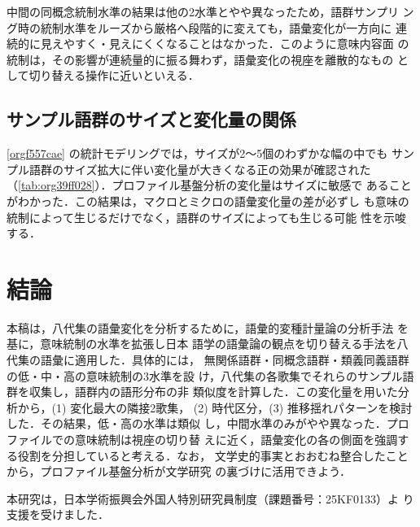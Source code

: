 \documentclass[submit]{ipsj}
\renewcommand{\ref}{\cref}
\begin{document}
中間の同概念統制水準の結果は他の2水準とやや異なったため，語群サンプリ
ング時の統制水準をルーズから厳格へ段階的に変えても，語彙変化が一方向に
連続的に見えやすく・見えにくくなることはなかった．このように意味内容面
の統制は，その影響が連続量的に振る舞わず，語彙変化の視座を離散的なもの
として切り替える操作に近いといえる．
\subsection{サンプル語群のサイズと変化量の関係\label{orgd277117}}
\label{sec:org412accf}
\ref{orgf557cae} の統計モデリングでは，サイズが2〜5個のわずかな幅の中でも
サンプル語群のサイズ拡大に伴い変化量が大きくなる正の効果が確認された
（\ref{tab:org39ff028}）．プロファイル基盤分析の変化量はサイズに敏感で
あることがわかった．この結果は，マクロとミクロの語彙変化量の差が必ずし
も意味の統制によって生じるだけでなく，語群のサイズによっても生じる可能
性を示唆する．
\section{結論\label{org396f025}}
\label{sec:org5bbac91}
本稿は，八代集の語彙変化を分析するために，語彙的変種計量論の分析手法
\cite{Speelman2003Profilebased} を基に，意味統制の水準を拡張し日本
語学の語彙論の観点を切り替える手法を八代集の語彙に適用した．具体的には，
無関係語群・同概念語群・類義同義語群の低・中・高の意味統制の3水準を設
け，八代集の各歌集でそれらのサンプル語群を収集し，語群内の語形分布の非
類似度を計算した．この変化量を用いた分析から，(1) 変化最大の隣接2歌集，
(2) 時代区分，(3) 推移揺れパターンを検討した．その結果，低・高の水準は類似
し，中間水準のみがやや異なった．プロファイルでの意味統制は視座の切り替
えに近く，語彙変化の各の側面を強調する役割を分担していると考える．なお，
文学史的事実とおおむね整合したことから，プロファイル基盤分析が文学研究
の裏づけに活用できよう．

\begin{acknowledgment}
  本研究は，日本学術振興会外国人特別研究員制度（課題番号：25KF0133）よ
  り支援を受けました．
\end{acknowledgment}


\end{document}
